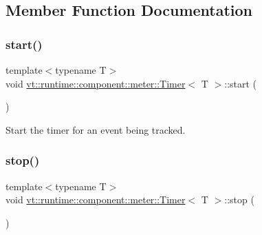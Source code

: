 \subsection{Member Function Documentation}
\mbox{\label{structvt_1_1runtime_1_1component_1_1meter_1_1_timer_a685bd06e9e97de01cf8948dec7d59462}} 
\subsubsection{\texorpdfstring{start()}{start()}}
{\footnotesize\ttfamily template$<$typename T$>$ \\
void \hyperlink{structvt_1_1runtime_1_1component_1_1meter_1_1_timer}{vt\+::runtime\+::component\+::meter\+::\+Timer}$<$ T $>$\+::start (\begin{DoxyParamCaption}{ }\end{DoxyParamCaption})\hspace{0.3cm}{\ttfamily [inline]}}



Start the timer for an event being tracked. 

\mbox{\label{structvt_1_1runtime_1_1component_1_1meter_1_1_timer_a302a9e413a1188b3a30ece1905123249}} 
\subsubsection{\texorpdfstring{stop()}{stop()}}
{\footnotesize\ttfamily template$<$typename T$>$ \\
void \hyperlink{structvt_1_1runtime_1_1component_1_1meter_1_1_timer}{vt\+::runtime\+::component\+::meter\+::\+Timer}$<$ T $>$\+::stop (\begin{DoxyParamCaption}{ }\end{DoxyParamCaption})\hspace{0.3cm}{\ttfamily [inline]}}



